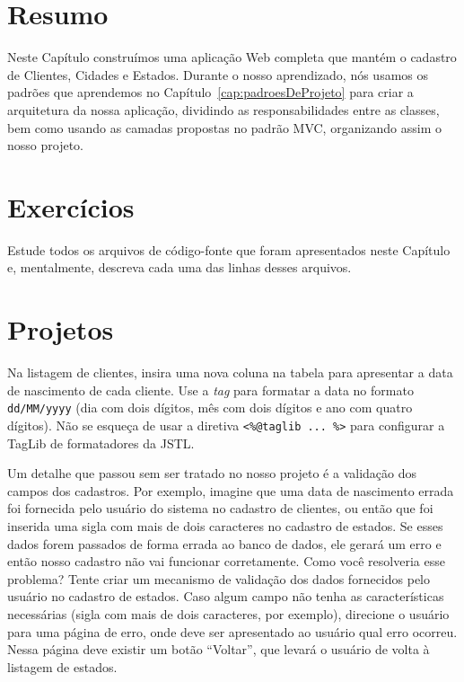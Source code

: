 \section{Resumo}

Neste Capítulo construímos uma aplicação Web completa que mantém o cadastro de Clientes, Cidades e Estados. Durante o nosso aprendizado, nós usamos os padrões que aprendemos no Capítulo~\ref{cap:padroesDeProjeto} para criar a arquitetura da nossa aplicação, dividindo as responsabilidades entre as classes, bem como usando as camadas propostas no padrão MVC, organizando assim o nosso projeto. 


\section{Exercícios}

\begin{exercicioSemArquivo}{}{}{}
    Estude todos os arquivos de código-fonte que foram apresentados neste Capítulo e, mentalmente, descreva cada uma das linhas desses arquivos.
\end{exercicioSemArquivo}


\section{Projetos}

\begin{projetoSemArquivo}{}{}{}
    Na listagem de clientes, insira uma nova coluna na tabela para apresentar a data de nascimento de cada cliente. Use a \textit{tag}  para formatar a data no formato \texttt{dd/MM/yyyy} (dia com dois dígitos, mês com dois dígitos e ano com quatro dígitos). Não se esqueça de usar a diretiva \texttt{<\%@taglib ... \%>} para configurar a TagLib de formatadores da JSTL. 
\end{projetoSemArquivo}

\begin{projetoSemArquivo}{}{}{}
    Um detalhe que passou sem ser tratado no nosso projeto é a validação dos campos dos cadastros. Por exemplo, imagine que uma data de nascimento errada foi fornecida pelo usuário do sistema no cadastro de clientes, ou então que foi inserida uma sigla com mais de dois caracteres no cadastro de estados. Se esses dados forem passados de forma errada ao banco de dados, ele gerará um erro e então nosso cadastro não vai funcionar corretamente. Como você resolveria esse problema? Tente criar um mecanismo de validação dos dados fornecidos pelo usuário no cadastro de estados. Caso algum campo não tenha as características necessárias (sigla com mais de dois caracteres, por exemplo), direcione o usuário para uma página de erro, onde deve ser apresentado ao usuário qual erro ocorreu. Nessa página deve existir um botão ``Voltar'', que levará o usuário de volta à listagem de estados.
\end{projetoSemArquivo}

